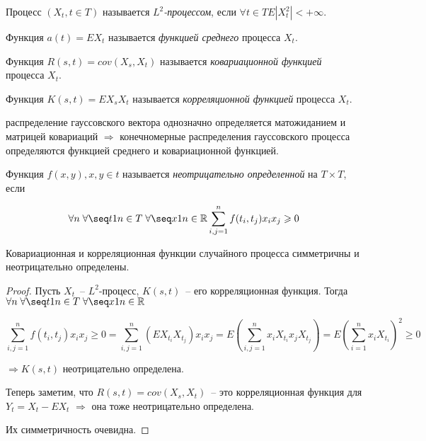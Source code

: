 \begin{definition}
Процесс $(X_t, t \in T)$ называется \emph{$L^2$-процессом}, если $\forall t \in T E|X_t^2| < +\infty$.

Функция $a(t) = EX_t$ называется \emph{функцией среднего} процесса $X_t$.

Функция $R(s,t) = cov(X_s, X_t)$ называется \emph{ковариационной функцией} процесса $X_t$.

Функция $K(s,t) = EX_sX_t$ называется \emph{корреляционной функцией} процесса $X_t$.
\end{definition}

\begin{remark}
распределение гауссовского вектора однозначно определяется матожиданием и матрицей ковариаций
$\Rightarrow$ конечномерные распределения гауссовского процесса определяются функцией среднего
и ковариационной функцией.
\end{remark}

\begin{definition}
Функция $f(x, y), x, y \in t$ называется \emph{неотрицательно определенной} на $T\times T$, если

$$\forall n \; \forall \seq t 1 n \in T \; \forall \seq x 1 n \in \myR
\sum_{i, j = 1}^{n} f(t_i, t_j) x_i x_j \geq 0$$
\end{definition}

\begin{lem}
Ковариационная и корреляционная функции случайного процесса симметричны и неотрицательно
определены.
\end{lem}
\begin{proof}
Пусть $X_t$~-- $L^2$-процесс, $K(s, t)$~-- его корреляционная функция. Тогда
$\forall n \; \forall \seq t 1 n \in T \; \forall \seq x 1 n \in \myR$

$$\sum_{i, j = 1}^{n} f(t_i, t_j) x_i x_j \geq 0 = \sum_{i,j=1}^n(EX_{t_i}X_{t_j})x_i x_j =
E(\sum_{i,j=1}^n x_iX_{t_i} x_j X_{t_j}) = E(\sum_{i=1}^n x_i X_{t_i})^2 \geq 0$$

$\Rightarrow K(s,t)$ неотрицательно определена.

Теперь заметим, что  $R(s,t) = cov(X_s, X_t)$~-- это корреляционная функция для  $Y_t = X_t - EX_t$
$\Rightarrow$ она тоже неотрицательно определена.

Их симметричность очевидна.
\end{proof}

